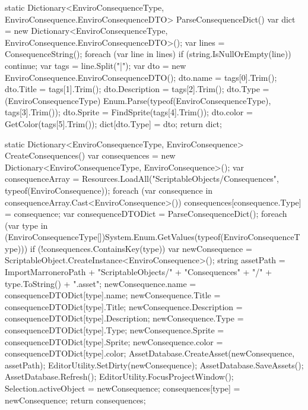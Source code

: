 \begin{mypython}[caption={Código para autogenerar DTOs de tipo EnviroConsequences.},label={alg:enviroSO1}]
static Dictionary<EnviroConsequenceType, EnviroConsequence.EnviroConsequenceDTO> ParseConsequenceDict()
{
    var dict = new Dictionary<EnviroConsequenceType, EnviroConsequence.EnviroConsequenceDTO>();
    var lines = ConsequenceString();
    foreach (var line in lines)
    {
        if (string.IsNullOrEmpty(line))
            continue;
        var tags = line.Split("|");
        var dto = new EnviroConsequence.EnviroConsequenceDTO();
        dto.name = tags[0].Trim();
        dto.Title = tags[1].Trim();
        dto.Description = tags[2].Trim();
        dto.Type = (EnviroConsequenceType) Enum.Parse(typeof(EnviroConsequenceType), tags[3].Trim());
        dto.Sprite = FindSprite(tags[4].Trim());
        dto.color = GetColor(tags[5].Trim());
        dict[dto.Type] = dto;
    }
    return dict;
}
\end{mypython}

\begin{mypython}[caption={Código para autogenerar ScriptableObject de tipo EnviroConsequences.},label={alg:enviroSO2}]
static Dictionary<EnviroConsequenceType, EnviroConsequence> CreateConsequences()
{
    var consequences = new Dictionary<EnviroConsequenceType, EnviroConsequence>();
    var consequenceArray = Resources.LoadAll("ScriptableObjects/Consequences", typeof(EnviroConsequence));
    foreach (var consequence in consequenceArray.Cast<EnviroConsequence>())
    {
        consequences[consequence.Type] = consequence;
    }
    var consequenceDTODict = ParseConsequenceDict();
    foreach (var type in (EnviroConsequenceType[])System.Enum.GetValues(typeof(EnviroConsequenceType)))
    {
        if (!consequences.ContainsKey(type))
        {
            var newConsequence = ScriptableObject.CreateInstance<EnviroConsequence>();
            string assetPath = ImportMarroneroPath + "ScriptableObjects/" + "Consequences" + "/" + type.ToString() + ".asset";
            newConsequence.name = consequenceDTODict[type].name;
            newConsequence.Title = consequenceDTODict[type].Title;
            newConsequence.Description = consequenceDTODict[type].Description;
            newConsequence.Type = consequenceDTODict[type].Type;
            newConsequence.Sprite = consequenceDTODict[type].Sprite;
            newConsequence.color = consequenceDTODict[type].color;
            AssetDatabase.CreateAsset(newConsequence, assetPath);
            EditorUtility.SetDirty(newConsequence);
            AssetDatabase.SaveAssets();
            AssetDatabase.Refresh();
            EditorUtility.FocusProjectWindow();
            Selection.activeObject = newConsequence;
            consequences[type] = newConsequence;
        }
    }
    return consequences;
}
\end{mypython}

